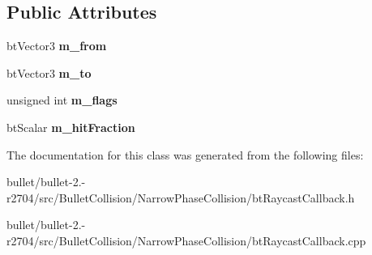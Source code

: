 \subsection*{Public Attributes}
\begin{DoxyCompactItemize}
\item 
\hypertarget{classbt_triangle_raycast_callback_abeb58bc424f22dda0061939895c76339}{bt\+Vector3 {\bfseries m\+\_\+from}}\label{classbt_triangle_raycast_callback_abeb58bc424f22dda0061939895c76339}

\item 
\hypertarget{classbt_triangle_raycast_callback_aa322a8ab074226440312548a7512e4bc}{bt\+Vector3 {\bfseries m\+\_\+to}}\label{classbt_triangle_raycast_callback_aa322a8ab074226440312548a7512e4bc}

\item 
\hypertarget{classbt_triangle_raycast_callback_a62a5d1ff4e30d29aa0de9cc8dcda8911}{unsigned int {\bfseries m\+\_\+flags}}\label{classbt_triangle_raycast_callback_a62a5d1ff4e30d29aa0de9cc8dcda8911}

\item 
\hypertarget{classbt_triangle_raycast_callback_a3f105a17c84acb05a1ff5a0a3fa9e43a}{bt\+Scalar {\bfseries m\+\_\+hit\+Fraction}}\label{classbt_triangle_raycast_callback_a3f105a17c84acb05a1ff5a0a3fa9e43a}

\end{DoxyCompactItemize}


The documentation for this class was generated from the following files\+:\begin{DoxyCompactItemize}
\item 
bullet/bullet-\/2.-\/r2704/src/\+Bullet\+Collision/\+Narrow\+Phase\+Collision/bt\+Raycast\+Callback.\+h\item 
bullet/bullet-\/2.-\/r2704/src/\+Bullet\+Collision/\+Narrow\+Phase\+Collision/bt\+Raycast\+Callback.\+cpp\end{DoxyCompactItemize}
